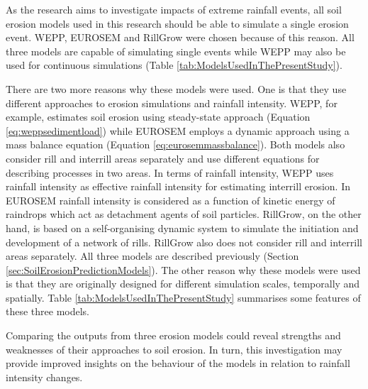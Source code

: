 As the research aims to investigate impacts of extreme rainfall events, all soil
erosion models used in this research should be able to simulate a single erosion
event. WEPP, EUROSEM and RillGrow were chosen because of this reason. All three
models are capable of simulating single events while WEPP may also be used for
continuous simulations (Table \ref{tab:ModelsUsedInThePresentStudy}).

There are two more reasons why these models were used. One is that they use
different approaches to erosion simulations and rainfall intensity. WEPP, for
example, estimates soil erosion using steady-state approach
(Equation \ref{eq:weppsedimentload}) while EUROSEM employs a dynamic approach
using a mass balance equation (Equation \ref{eq:eurosemmassbalance}).
Both models also consider rill and interrill areas separately and use
different equations for describing processes in two areas. In terms of
rainfall intensity, WEPP uses rainfall intensity as effective rainfall
intensity for estimating interrill erosion. In EUROSEM rainfall intensity is
considered as a function of kinetic energy of raindrops which act as detachment
agents of soil particles.
RillGrow, on the other hand, is based on a
self-organising dynamic system to simulate the initiation and development of a
network of rills. RillGrow also does not consider rill and interrill areas
separately. All three models are described previously (Section
\ref{sec:SoilErosionPredictionModels}).
The other reason why these models were used is that they are
originally designed for different simulation scales, temporally and spatially.
Table \ref{tab:ModelsUsedInThePresentStudy} summarises some features of these
three models.

Comparing the outputs from three erosion models could reveal strengths and
weaknesses of their approaches to soil erosion. In turn, this investigation may
provide improved insights on the behaviour of the models in relation to rainfall
intensity changes.

